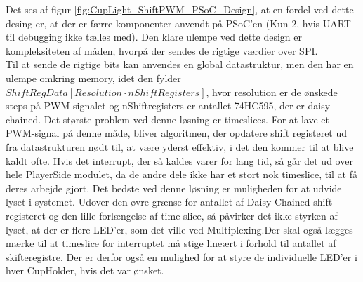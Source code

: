 \documentclass[Softwaredesign/Softwaredesign_main.tex]{subfiles}
\begin{document}
Det ses af figur \ref{fig:CupLight_ShiftPWM_PSoC_Design}, at en fordel ved dette desing er, at der er færre komponenter anvendt på PSoC'en (Kun 2, hvis UART til debugging ikke tælles med). Den klare ulempe ved dette design er kompleksiteten af måden, hvorpå der sendes de rigtige værdier over SPI.\\
Til at sende de rigtige bits kan anvendes en global datastruktur, men den har en ulempe omkring memory, idet den fylder $ShiftRegData[Resolution \cdot nShiftRegisters]$, hvor resolution er de ønskede steps på PWM signalet og nShiftregisters er antallet 74HC595, der er daisy chained. Det største problem ved denne løsning er timeslices. For at lave et PWM-signal på denne måde, bliver algoritmen, der opdatere shift registeret ud fra datastrukturen nødt til, at være yderst effektiv, i det den kommer til at blive kaldt ofte. Hvis det interrupt, der så kaldes varer for lang tid, så går det ud over hele PlayerSide modulet, da de andre dele ikke har et stort nok timeslice, til at få deres arbejde gjort. Det bedste ved denne løsning er muligheden for at udvide lyset i systemet. Udover den øvre grænse for antallet af Daisy Chained shift registeret og den lille forlængelse af time-slice, så påvirker det ikke styrken af lyset, at der er flere LED'er, som det ville ved Multiplexing.Der skal også lægges mærke til at timeslice for interruptet må stige lineært i forhold til antallet af skifteregistre. Der er derfor også en mulighed for at styre de individuelle LED'er i hver CupHolder, hvis det var ønsket.
\end{document}
